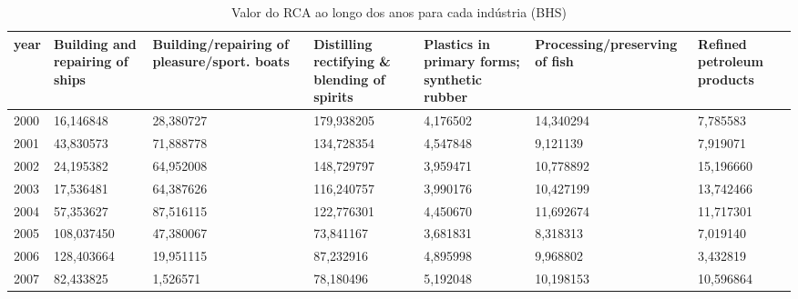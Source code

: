 \begin{table}
\centering
\caption{Valor do RCA ao longo dos anos para cada indústria (BHS)}
\begin{tabular}{p{1cm}p{2cm}p{2cm}p{2cm}p{2cm}p{2cm}p{2cm}}
\toprule
 year &  Building and repairing of ships &  Building/repairing of pleasure/sport. boats &  Distilling rectifying \& blending of spirits &  Plastics in primary forms; synthetic rubber &  Processing/preserving of fish &  Refined petroleum products \\
\midrule
 2000 &                        16,146848 &                                    28,380727 &                                   179,938205 &                                     4,176502 &                      14,340294 &                    7,785583 \\
 2001 &                        43,830573 &                                    71,888778 &                                   134,728354 &                                     4,547848 &                       9,121139 &                    7,919071 \\
 2002 &                        24,195382 &                                    64,952008 &                                   148,729797 &                                     3,959471 &                      10,778892 &                   15,196660 \\
 2003 &                        17,536481 &                                    64,387626 &                                   116,240757 &                                     3,990176 &                      10,427199 &                   13,742466 \\
 2004 &                        57,353627 &                                    87,516115 &                                   122,776301 &                                     4,450670 &                      11,692674 &                   11,717301 \\
 2005 &                       108,037450 &                                    47,380067 &                                    73,841167 &                                     3,681831 &                       8,318313 &                    7,019140 \\
 2006 &                       128,403664 &                                    19,951115 &                                    87,232916 &                                     4,895998 &                       9,968802 &                    3,432819 \\
 2007 &                        82,433825 &                                     1,526571 &                                    78,180496 &                                     5,192048 &                      10,198153 &                   10,596864 \\

\end{tabular}
\end{table}
